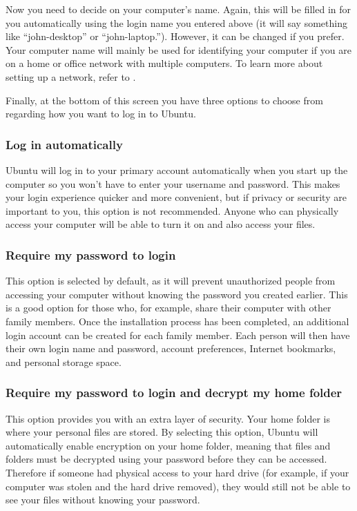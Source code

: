 Now you need to decide on your computer's name. Again, this will be filled in for you automatically using the login name you entered above (it will say something like ``john-desktop'' or ``john-laptop.''). However, it can be changed if you prefer. Your computer name will mainly be used for identifying your computer if you are on a home or office network with multiple computers. To learn more about setting up a network, refer to .

Finally, at the bottom of this screen you have three options to choose from regarding how you want to log in to Ubuntu.

\subsubsection{Log in automatically}

Ubuntu will log in to your primary account automatically when you start up the computer so you won't have to enter your username and password. This makes your login experience quicker and more convenient, but if privacy or security are important to you, this option is not recommended. Anyone who can physically access your computer will be able to turn it on and also access your files.  

\subsubsection{Require my password to login}

This option is selected by default, as it will prevent unauthorized people from accessing your computer without knowing the password you created earlier. This is a good option for those who, for example, share their computer with other family members. Once the installation process has been completed, an additional login account can be created for each family member. Each person will then have their own login name and password, account preferences, Internet bookmarks, and personal storage space. 

\subsubsection{Require my password to login and decrypt my home folder}

This option provides you with an extra layer of security. Your home folder is where your personal files are stored. By selecting this option, Ubuntu will automatically enable encryption on your home folder, meaning that files and folders must be \gls{decrypted} using your password before they can be accessed. Therefore if someone had physical access to your hard drive (for example, if your computer was stolen and the hard drive removed), they would still not be able to see your files without knowing your password. 

